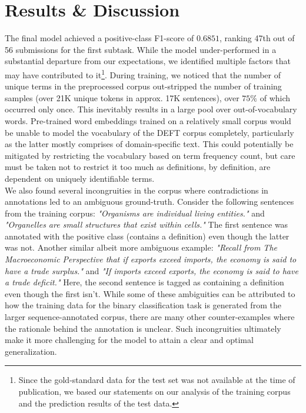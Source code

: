 \documentclass[11pt]{article}
\begin{document}
\section{Results \& Discussion}
The final model achieved a positive-class F1-score of $0.6851$, ranking 47th out of 56 submissions for the first subtask. While the
model under-performed in a substantial departure from our expectations, we identified multiple factors that may have contributed to
it\footnote{Since the gold-standard data for the test set was not available at the time of publication, we based our statements on
our analysis of the training corpus and the prediction results of the test data.}. During training, we noticed that the number of
unique terms in the preprocessed corpus out-stripped the number of training samples (over 21K unique tokens in approx. 17K
sentences), over $75\%$ of which occurred only once. This inevitably results in a large pool over out-of-vocabulary words.
Pre-trained word embeddings trained on a relatively small corpus would be unable to model the vocabulary of the DEFT corpus completely,
particularly as the latter mostly comprises of domain-specific text. This could potentially be mitigated by restricting the
vocabulary based on term frequency count, but care must be taken not to restrict it too much as definitions, by definition, are
dependent on uniquely identifiable terms.\\

We also found several incongruities in the corpus where contradictions in annotations led to an ambiguous ground-truth. Consider the
following sentences from the training corpus: \emph{"Organisms are individual living entities."} and \emph{"Organelles are small
structures that exist within cells."} The first sentence was annotated with the positive class (contains a definition) even though the
latter was not. Another similar albeit more ambiguous example: \emph{"Recall from The Macroeconomic Perspective that if exports exceed imports, the economy is said to have a trade surplus."} and \emph{"If imports exceed exports, the economy is said to have a trade deficit."} Here, the second sentence is tagged as containing a definition even though the first isn't. While some of these
ambiguities can be attributed to how the training data for the binary classification task is generated from the larger sequence-annotated
corpus, there are many other counter-examples where the rationale behind the annotation is unclear. Such incongruities ultimately
make it more challenging for the model to attain a clear and optimal generalization.\\
\end{document}
